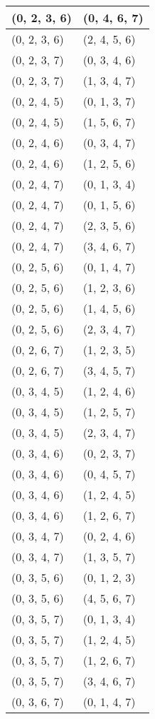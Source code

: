 \begin{footnotesize}
\begin{longtable}[c]{|l|l|}
(0, 2, 3, 6)
&(0, 4, 6, 7)
\\ \hline
(0, 2, 3, 6)
&(2, 4, 5, 6)
\\ \hline
(0, 2, 3, 7)
&(0, 3, 4, 6)
\\ \hline
(0, 2, 3, 7)
&(1, 3, 4, 7)
\\ \hline
(0, 2, 4, 5)
&(0, 1, 3, 7)
\\ \hline
(0, 2, 4, 5)
&(1, 5, 6, 7)
\\ \hline
(0, 2, 4, 6)
&(0, 3, 4, 7)
\\ \hline
(0, 2, 4, 6)
&(1, 2, 5, 6)
\\ \hline
(0, 2, 4, 7)
&(0, 1, 3, 4)
\\ \hline
(0, 2, 4, 7)
&(0, 1, 5, 6)
\\ \hline
(0, 2, 4, 7)
&(2, 3, 5, 6)
\\ \hline
(0, 2, 4, 7)
&(3, 4, 6, 7)
\\ \hline
(0, 2, 5, 6)
&(0, 1, 4, 7)
\\ \hline
(0, 2, 5, 6)
&(1, 2, 3, 6)
\\ \hline
(0, 2, 5, 6)
&(1, 4, 5, 6)
\\ \hline
(0, 2, 5, 6)
&(2, 3, 4, 7)
\\ \hline
(0, 2, 6, 7)
&(1, 2, 3, 5)
\\ \hline
(0, 2, 6, 7)
&(3, 4, 5, 7)
\\ \hline
(0, 3, 4, 5)
&(1, 2, 4, 6)
\\ \hline
(0, 3, 4, 5)
&(1, 2, 5, 7)
\\ \hline
(0, 3, 4, 5)
&(2, 3, 4, 7)
\\ \hline
(0, 3, 4, 6)
&(0, 2, 3, 7)
\\ \hline
(0, 3, 4, 6)
&(0, 4, 5, 7)
\\ \hline
(0, 3, 4, 6)
&(1, 2, 4, 5)
\\ \hline
(0, 3, 4, 6)
&(1, 2, 6, 7)
\\ \hline
(0, 3, 4, 7)
&(0, 2, 4, 6)
\\ \hline
(0, 3, 4, 7)
&(1, 3, 5, 7)
\\ \hline
(0, 3, 5, 6)
&(0, 1, 2, 3)
\\ \hline
(0, 3, 5, 6)
&(4, 5, 6, 7)
\\ \hline
(0, 3, 5, 7)
&(0, 1, 3, 4)
\\ \hline
(0, 3, 5, 7)
&(1, 2, 4, 5)
\\ \hline
(0, 3, 5, 7)
&(1, 2, 6, 7)
\\ \hline
(0, 3, 5, 7)
&(3, 4, 6, 7)
\\ \hline
(0, 3, 6, 7)
&(0, 1, 4, 7)
\\ \hline

\end{longtable}
\end{footnotesize}
